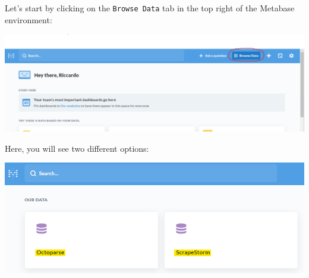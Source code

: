 \documentclass[]{book}
\begin{document}
Let's start by clicking on the \texttt{Browse\ Data} tab in the top right of the Metabase environment:

\includegraphics{images/MetabaseBrowseData.png}

Here, you will see two different options:

\includegraphics{images/DBSelection.png}
\end{document}

